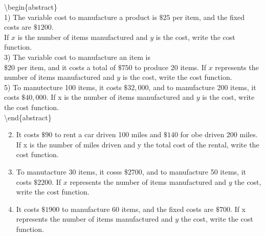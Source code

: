 \textbackslash begin\{abstract\}\\
1) The variable cost to manufacture a product is $\$ 25$ per item, and the fixed costs are $\$ 1200$.\\
If $x$ is the number of items manufactured and $y$ is the cost, write the cost function.\\
3) The variable cost to manufacture an item is\\
$\$ 20$ per item, and it costs a total of $\$ 750$ to produce 20 items. If $x$ represents the number of items manufactured and $y$ is the cost, write the cost function.\\
5) To manutecture 100 items, it costs $\$ 32,000$, and to manufacture 200 items, it costs $\$ 40,000$. If x is the number of items manufactured and $y$ is the cost, write the cost function.\\
\textbackslash end\{abstract\}

\begin{enumerate}
  \setcounter{enumi}{1}
  \item It costs $\$ 90$ to rent a car driven 100 miles and $\$ 140$ for obe driven 200 miles. If x is the number of miles driven and y the total cost of the rental, write the cost function.
  \item To manutacture 30 items, it cosss $\$ 2700$, and to manufacture 50 items, it costs $\$ 2200$. If $x$ represents the number of items manufactured and $y$ the cost, write the cost function.
  \item It costs $\$ 1900$ to manufacture 60 items, and the fixed costs are $\$ 700$. If x represents the number of items manufactured and $y$ the cost, write the cost function.
\end{enumerate}

